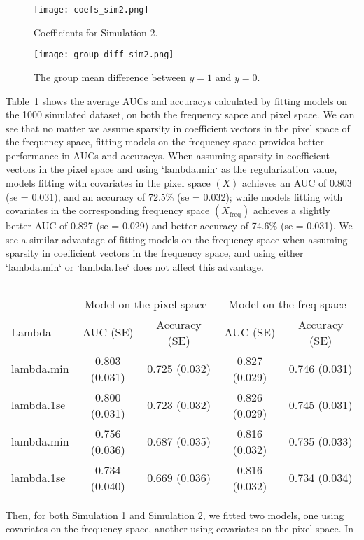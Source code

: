 \documentclass[12pt]{article}
\begin{document}
\begin{figure}[h!]
	\centering
	\texttt{[image: coefs\_sim2.png]}
  \caption{Coefficients for Simulation 2.}
  \label{fig:coefs_sim2}
\end{figure}

\begin{figure}[h!]
	\centering
	\texttt{[image: group\_diff\_sim2.png]}
	\caption{The group mean difference between \( y = 1 \) and \( y = 0 \).}
	\label{fig:group_diff2}
\end{figure}

Table~\ref*{tab:auc_acc_table} shows the average AUCs and accuracys calculated
by fitting models on the 1000 simulated dataset, on both the frequency sapce
and pixel space. We can see that no matter we assume sparsity in coefficient
vectors in the pixel space of the frequency space, fitting models on the
frequency space provides better performance in AUCs and accuracys. When
assuming sparsity in coefficient vectors in the pixel space and using
`lambda.min` as the regularization value, models fitting with covariates in
the pixel space \( (X) \) achieves an AUC of 0.803 (se = 0.031), and an
accuracy of 72.5\% (se = 0.032); while models fitting with covariates in the
corresponding frequency space \( (X_{\text{freq}}) \) achieves a slightly
better AUC of 0.827 (se = 0.029) and better accuracy of 74.6\% (se = 0.031).
We see a similar advantage of fitting models on the frequency space when
assuming sparsity in coefficient vectors in the frequency space, and using
either `lambda.min` or `lambda.1se` does not affect this advantage.

\begin{table}[h!]
\centering
\caption{}
\label{tab:auc_acc_table}
\begin{tabular}{l|cc|cc}
\toprule
& \multicolumn{2}{c}{Model on the pixel space} & \multicolumn{2}{c}{Model on the freq space} \\ 
	Lambda & AUC (SE) & Accuracy (SE) & AUC (SE) & Accuracy (SE) \\ 
\midrule
	lambda.min & 0.803 (0.031) & 0.725 (0.032) & 0.827 (0.029) & 0.746 (0.031) \\
	lambda.1se & 0.800 (0.031) & 0.723 (0.032) & 0.826 (0.029) & 0.745 (0.031) \\ 
	lambda.min & 0.756 (0.036) & 0.687 (0.035) & 0.816 (0.032) & 0.735 (0.033)  \\
	lambda.1se & 0.734 (0.040) & 0.669 (0.036) & 0.816 (0.032) & 0.734 (0.034) \\
\bottomrule
\end{tabular}
\end{table}

Then, for both Simulation 1 and Simulation 2, we fitted two models, one using
covariates on the frequency space, another using covariates on the pixel
space. In 
\end{document}
